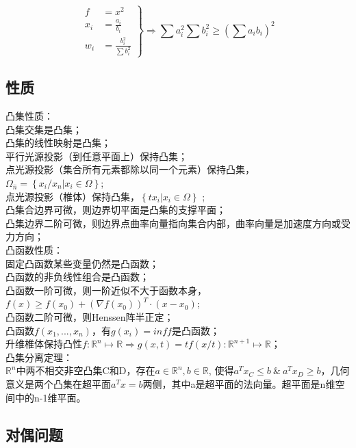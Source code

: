 \documentclass[UTF8]{article}
\begin{document}
\begin{equation}
    \left.
    \begin{aligned}
    f&=x^2 \\
    x_i&=\frac{a_i}{b_i} \\
    w_i&=\frac{b_i^2}{\sum b_i^2}
    \end{aligned}
     \right\} \Rightarrow
     \sum a_i^2 \sum b_i^2 \geqslant \left( \sum a_ib_i \right)^2
\end{equation}

\subsection{性质}
凸集性质：\\
凸集交集是凸集；\\
凸集的线性映射是凸集；\\
平行光源投影（到任意平面上）保持凸集；\\
点光源投影（集合所有元素都除以同一个元素）保持凸集，
$\Omega _{\hat{n}}=\left\{ x_i/x_n |x_i\in \Omega \right \} $;\\
点光源投影（椎体）保持凸集，$\left\{ tx_i |x_i\in \Omega \right\}$ ;\\
凸集合边界可微，则边界切平面是凸集的支撑平面；\\
凸集边界二阶可微，则边界点曲率向量指向集合内部，曲率向量是加速度方向或受力方向；\\

凸函数性质：\\
固定凸函数某些变量仍然是凸函数；\\
凸函数的非负线性组合是凸函数；\\ 
凸函数一阶可微，则一阶近似不大于函数本身，
$f(x)\geqslant f(x_0)+\left( \nabla f(x_0) \right)^T \cdot (x-x_0)$;\\
凸函数二阶可微，则Henssen阵半正定；\\
凸函数$f(x_1,...,x_n)$，有$g(x_i)=inf f$是凸函数；\\
升维椎体保持凸性$f:\mathbb{R}^n \mapsto \mathbb{R} \Rightarrow 
g(x,t)=tf(x/t): \mathbb{R}^{n+1} \mapsto \mathbb{R} $；\\

凸集分离定理：\\
$\mathbb{{R}}^n$中两不相交非空凸集C和D，存在$a \in \mathbb{R}^n, b \in \mathbb{R}$, 使得$a^Tx_C \leqslant b\ \&\ a^Tx_D \geqslant b$，几何意义是两个凸集在超平面$a^Tx=b$两侧，其中a是超平面的法向量。超平面是n维空间中的n-1维平面。\\

\subsection{对偶问题}
\end{document}
